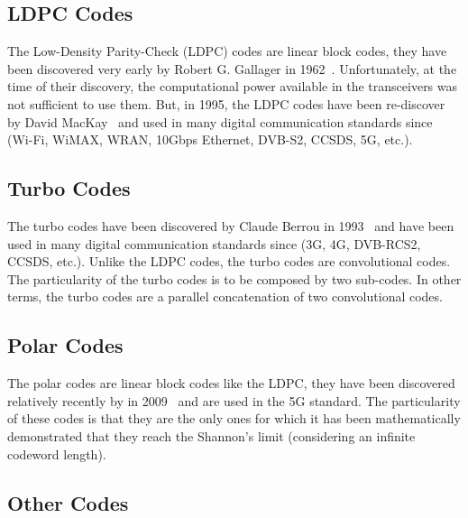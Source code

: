 \subsection{LDPC Codes}

The Low-Density Parity-Check (LDPC) codes are linear block codes, they have been
discovered very early by Robert G. Gallager in 1962~\cite{Gallager1962}.
Unfortunately, at the time of their discovery, the computational power available
in the transceivers was not sufficient to use them. But, in 1995, the LDPC codes
have been re-discover by David MacKay~\cite{MacKay1995} and used in many digital
communication standards since (Wi-Fi, WiMAX, WRAN, 10Gbps Ethernet, DVB-S2,
CCSDS, 5G, etc.).


\subsection{Turbo Codes}

The turbo codes have been discovered by Claude Berrou in 1993~\cite{Berrou1993}
and have been used in many digital communication standards since (3G, 4G,
DVB-RCS2, CCSDS, etc.). Unlike the LDPC codes, the turbo codes are convolutional
codes. The particularity of the turbo codes is to be composed by two sub-codes.
In other terms, the turbo codes are a parallel concatenation of two
convolutional codes.

\subsection{Polar Codes}

The polar codes are linear block codes like the LDPC, they have been discovered
relatively recently by \Arikan in 2009~\cite{Arikan2009} and are used in the
5G standard. The particularity of these codes is that they are the only ones for
which it has been mathematically demonstrated that they reach the Shannon's
limit (considering an infinite codeword length).

\subsection{Other Codes}

